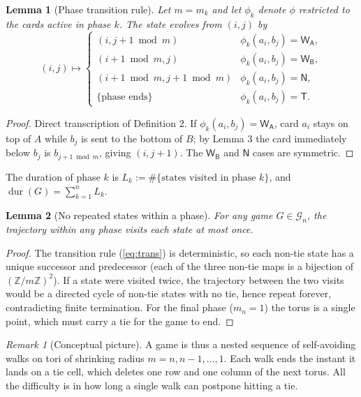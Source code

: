 \documentclass[11pt]{article}
\newtheorem{lemma}{Lemma}
\theoremstyle{definition}
\theoremstyle{remark}
\newtheorem{remark}{Remark}
\DeclareMathOperator{\dur}{dur}
\newcommand{\WA}{\mathsf{W_A}}
\newcommand{\WB}{\mathsf{W_B}}
\newcommand{\TT}{\mathsf{T}}
\newcommand{\NN}{\mathsf{N}}
\begin{document}
\begin{lemma}[Phase transition rule] Let $m=m_k$ and let $\phi_k$ denote $\phi$ restricted to the cards active in phase $k$. The state evolves from $(i,j)$ by
\begin{equation}\label{eq:trans}
(i,j)\mapsto
\begin{cases}
(i, j + 1 \bmod m) & \phi_k(a_i,b_j)=\WA, \\
(i + 1 \bmod m, j) & \phi_k(a_i,b_j)=\WB, \\
(i + 1 \bmod m, j + 1 \bmod m) & \phi_k(a_i,b_j)=\NN, \\
\{\text{phase ends}\} & \phi_k(a_i,b_j)=\TT.
\end{cases}
\end{equation}
\end{lemma}
\begin{proof}
Direct transcription of Definition 2. If $\phi_k(a_i,b_j)=\WA$, card $a_i$ stays on top of $A$ while $b_j$ is sent to the bottom of $B$; by Lemma 3 the card immediately below $b_j$ is $b_{j+1 \bmod m}$, giving $(i, j+1)$. The $\WB$ and $\NN$ cases are symmetric.
\end{proof}

The duration of phase $k$ is $L_k:=\#\{\text{states visited in phase } k\}$, and $\dur(G)=\sum_{k=1}^n L_k$.

\begin{lemma}[No repeated states within a phase] For any game $G\in\mathcal{G}_n$, the trajectory within any phase visits each state at most once.
\end{lemma}
\begin{proof}
The transition rule (\ref{eq:trans}) is deterministic, so each non-tie state has a unique successor and predecessor (each of the three non-tie maps is a bijection of $(\mathbb{Z}/m\mathbb{Z})^2$). If a state were visited twice, the trajectory between the two visits would be a directed cycle of non-tie states with no tie, hence repeat forever, contradicting finite termination. For the final phase ($m_n=1$) the torus is a single point, which must carry a tie for the game to end.
\end{proof}

\begin{remark}[Conceptual picture] A game is thus a nested sequence of self-avoiding walks on tori of shrinking radius $m=n,n-1,\dots,1$. Each walk ends the instant it lands on a tie cell, which deletes one row and one column of the next torus. All the difficulty is in how long a single walk can postpone hitting a tie.
\end{remark}
\end{document}
